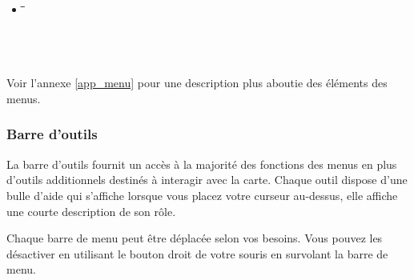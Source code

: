 \begin{itemize}
\item {}
\begin{tabbing}
\hspace{4.5cm}\=\hspace{3cm}\=\hspace{3.5cm}\= \kill
{}
 \> 
 \>            
 \> \\
 \> 
 \>           
 \\
 \\
 \\
\end{tabbing}

\end{itemize}

Voir l'annexe \ref{app_menu} pour une description plus aboutie des éléments des menus.

\subsubsection{Barre d'outils}\label{label_toolbars}

%

La barre d'outils fournit un accès à la majorité des fonctions des menus en plus d'outils additionnels destinés à interagir avec la carte. Chaque outil dispose d'une bulle d'aide qui s'affiche lorsque vous placez votre curseur au-dessus, elle affiche une courte description de son rôle.

Chaque barre de menu peut être déplacée selon vos besoins. Vous pouvez les désactiver en utilisant le bouton droit de votre souris en survolant la barre de menu.

%

